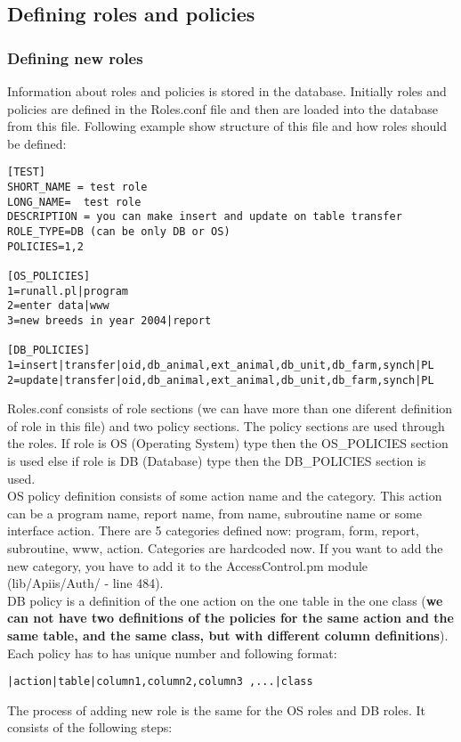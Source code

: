 \subsection{Defining roles and policies\label{Roles and policies}}

\subsubsection{Defining new roles}
Information about roles and policies is stored in the database. Initially roles and policies are defined in the Roles.conf file and then are loaded into the database from this file. Following example show structure of this file and how roles should be defined:
\begin{verbatim}
[TEST]
SHORT_NAME = test role 
LONG_NAME=  test role
DESCRIPTION = you can make insert and update on table transfer
ROLE_TYPE=DB (can be only DB or OS)
POLICIES=1,2

[OS_POLICIES]
1=runall.pl|program
2=enter data|www
3=new breeds in year 2004|report

[DB_POLICIES]
1=insert|transfer|oid,db_animal,ext_animal,db_unit,db_farm,synch|PL
2=update|transfer|oid,db_animal,ext_animal,db_unit,db_farm,synch|PL
\end{verbatim} 
Roles.conf consists of role sections (we can have more than one diferent definition of role in this file) and two policy sections. The policy sections are used through the roles. If role is OS (Operating System) type then the OS\_POLICIES section is used else if role is DB (Database) type then the DB\_POLICIES section is used.\\
 OS policy definition consists of some action name and the category. This action can be a program name, report name, from name, subroutine name or some interface action. There are 5 categories defined now: program, form, report, subroutine, www, action. Categories are hardcoded now. If you want to add the new category, you have to add it to the AccessControl.pm module (lib/Apiis/Auth/ - line 484).\\
DB policy is a definition of the one action on the one table in the one class (\textbf{we can not have two definitions of the policies for the same action and the same table, and the same class, but with different column definitions}). Each policy has to has unique number and following format:
\begin{verbatim}
|action|table|column1,column2,column3 ,...|class 
\end{verbatim} 
The process of adding new role is the same for the OS roles and DB roles. It consists of the following steps:
